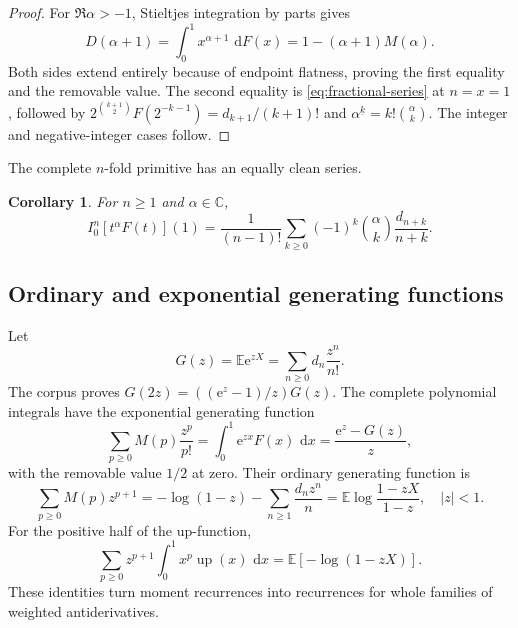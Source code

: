 \documentclass[11pt,oneside]{article}
\numberwithin{equation}{section}
\newtheorem{corollary}[theorem]{Corollary}
\theoremstyle{definition}
\theoremstyle{remark}
\newcommand{\C}{\mathbb C}
\newcommand{\E}{\mathbb E}
\newcommand{\Up}{\operatorname{up}}
\newcommand{\dd}{\,\mathrm d}
\newcommand{\e}{\mathrm e}
\newcommand{\fall}[2]{#1^{\underline{#2}}}
\begin{document}
\begin{proof}
For $\Re\alpha>-1$, Stieltjes integration by parts gives
\[
 D(\alpha+1)=\int_0^1x^{\alpha+1}\,\dd F(x)
 =1-(\alpha+1)M(\alpha).
\]
Both sides extend entirely because of endpoint flatness, proving the first equality and the
removable value.  The second equality is \eqref{eq:fractional-series} at $n=x=1$, followed by
$2^{\binom{k+1}{2}}F(2^{-k-1})=d_{k+1}/(k+1)!$ and
$\fall\alpha k=k!\binom\alpha k$.  The integer and negative-integer cases follow.
\end{proof}

The complete $n$-fold primitive has an equally clean series.

\begin{corollary}
For $n\ge1$ and $\alpha\in\C$,
\begin{equation}
 \boxed{
 I_0^n[t^\alpha F(t)](1)
 =\frac1{(n-1)!}\sum_{k\ge0}(-1)^k\binom\alpha k
 \frac{d_{n+k}}{n+k}.}
 \label{eq:complete-nfold}
\end{equation}
\end{corollary}

\subsection{Ordinary and exponential generating functions}

Let
\begin{equation}
 G(z)=\E\e^{zX}=\sum_{n\ge0}d_n\frac{z^n}{n!}.                \label{eq:G}
\end{equation}
The corpus proves $G(2z)=((\e^z-1)/z)G(z)$.  The complete polynomial integrals have the
exponential generating function
\begin{equation}
 \boxed{
 \sum_{p\ge0}M(p)\frac{z^p}{p!}
 =\int_0^1\e^{zx}F(x)\,\dd x
 =\frac{\e^z-G(z)}{z},}
 \label{eq:M-egf}
\end{equation}
with the removable value $1/2$ at zero.  Their ordinary generating function is
\begin{equation}
 \boxed{
 \sum_{p\ge0}M(p)z^{p+1}
 =-\log(1-z)-\sum_{n\ge1}\frac{d_nz^n}{n}
 =\E\log\frac{1-zX}{1-z},\quad |z|<1.}
 \label{eq:M-ogf}
\end{equation}
For the positive half of the up-function,
\begin{equation}
 \sum_{p\ge0}z^{p+1}\int_0^1x^p\Up(x)\,\dd x
 =\E[-\log(1-zX)].                                          \label{eq:up-ogf}
\end{equation}
These identities turn moment recurrences into recurrences for whole families of weighted
antiderivatives.
\end{document}
